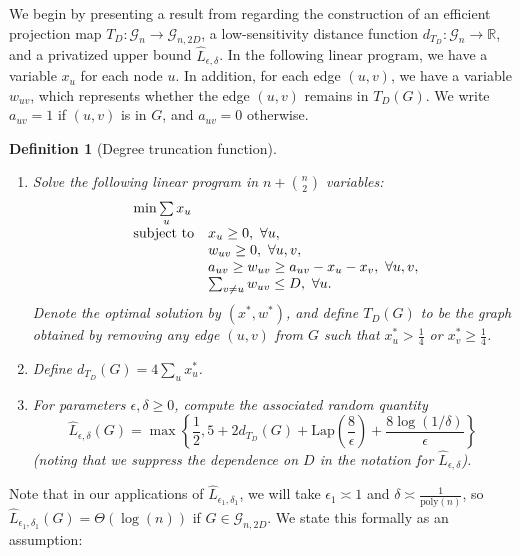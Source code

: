 \documentclass{article}
\newtheorem{definition}{Definition}
\begin{document}
We begin by presenting a result from \cite{blocki2013differentially} regarding the construction of an efficient projection map $T_D : \mathcal{G}_n \rightarrow \mathcal{G}_{n, 2D}$, a low-sensitivity distance function $d_{T_D} : \mathcal{G}_n \rightarrow \mathbb{R}$, and a privatized upper bound $\hat{L}_{\epsilon, \delta}$. In the following linear program, we have a variable $x_u$ for each node $u$. In addition, for each edge $(u, v)$, we have a variable $w_{uv}$, which represents whether the edge $(u, v)$ remains in $T_D(G)$. We write $a_{uv} = 1$ if $(u, v)$ is in $G$, and $a_{uv} = 0$ otherwise.

\begin{definition} [Degree truncation function]
\label{def:smooth_proj}
\mbox{}
\begin{enumerate}
\item Solve the following linear program in $n + \binom{n}{2}$ variables:
\begin{equation}
\label{eq:Blocki_LP_Eq}
\begin{array}{ll@{}ll}
\min\sum\limits_{u} x_u &\\
\mathrm{subject \ to}& \displaystyle x_u \geq 0, \ \forall u,\\                                                &w_{uv} \geq 0, \ \forall u, v,\\
    &a_{uv} \geq w_{uv} \geq a_{uv} - x_u - x_v, \ \forall u, v,\\
    & \sum_{v \neq u}w_{uv} \leq D, \ \forall u.
\end{array}
\end{equation}
Denote the optimal solution by $(x^*, w^*)$, and define $T_D(G)$ to be the graph obtained by removing any edge $(u, v)$ from $G$ such that $x_u^* > \frac{1}{4}$ or $x_v^* \geq \frac{1}{4}$.
\item Define $d_{T_D}(G) = 4\sum_{u}x_u^*$. 
\item For parameters $\epsilon, \delta \ge 0$, compute the associated random quantity
\begin{equation*}
\hat{L}_{\epsilon, \delta}(G) = \max\left\{\frac{1}{2}, 5 + 2 d_{T_D}(G) + \mathrm{Lap}\left(\frac{8}{\epsilon}\right) + \frac{8 \log(1/\delta)}{\epsilon}\right\}
\end{equation*}
(noting that we suppress the dependence on $D$ in the notation for $\hat{L}_{\epsilon, \delta}$).
\end{enumerate}
\end{definition}

Note that in our applications of $\hat{L}_{\epsilon_1, \delta_1}$, we will take $\epsilon_1 \asymp 1$ and $\delta \asymp \frac{1}{\mathrm{poly}(n)}$, so $\hat{L}_{\epsilon_1, \delta_1}(G) = \Theta(\log(n))$ if $G \in \mathcal{G}_{n, 2D}$. We state this formally as an assumption:
\end{document}
